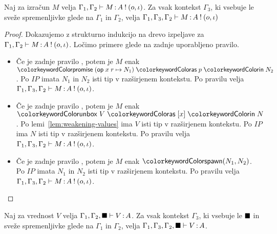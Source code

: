 \begin{lema}\label{lem:weakening-comp-2}
	Naj za izračun $M$ velja $\Gamma_1, \Gamma_2 \vdash M \mathinner{:} A \mathbin{!} (o, \iota)$. Za vsak kontekst $\Gamma_3$, ki vsebuje le sveže spremenljivke glede na $\Gamma_1$ in $\Gamma_2$, velja $\Gamma_1, \Gamma_3, \Gamma_2 \vdash M \mathinner{:} A \mathbin{!} (o, \iota)$
\end{lema}

\begin{proof}
	Dokazujemo z strukturno indukcijo na drevo izpeljave za $\Gamma_1, \Gamma_2 \vdash M \mathinner{:} A \mathbin{!} (o, \iota)$.
	Ločimo primere glede na zadnje uporabljeno pravilo.
	
	\begin{itemize}
		\item Če je zadnje pravilo , potem je $M$ enak $\tmwithrec{op}{x}{r}{N_1}{p}{N_2}$.
		Po $IP$ imata $N_1$ in $N_2$ isti tip v razširjenem kontekstu.
		Po pravilu  velja $\Gamma_1, \Gamma_3, \Gamma_2 \vdash M \mathinner{:} A \mathbin{!} (o, \iota)$.
		
		\item Če je zadnje pravilo , potem je $M$ enak $\tmunbox{V}{x}{N}$.
		Po lemi~\ref{lem:weakening-values} ima $V$ isti tip v razširjenem kontekstu.
		Po $IP$ ima $N$ isti tip v razširjenem kontekstu.
		Po pravilu  velja $\Gamma_1, \Gamma_3, \Gamma_2 \vdash M \mathinner{:} A \mathbin{!} (o, \iota)$.
		
		\item Če je zadnje pravilo , potem je $M$ enak $\tmspawn{N_1}{N_2}$.
		Po $IP$ imata $N_1$ in $N_2$ isti tip v razširjenem kontekstu.
		Po pravilu  velja $\Gamma_1, \Gamma_3, \Gamma_2 \vdash M \mathinner{:} A \mathbin{!} (o, \iota)$.
		
	\end{itemize}
\end{proof}


\begin{lema}\label{lem:weakening-values-bb}
	Naj za vrednost $V$ velja $\Gamma_1, \Gamma_2, \blacksquare \vdash V \mathinner{:} A$.
	Za vsak kontekst $\Gamma_3$, ki vsebuje le $\blacksquare$ in sveže spremenljivke glede na $\Gamma_1$ in $\Gamma_2$, velja $\Gamma_1, \Gamma_3, \Gamma_2, \blacksquare \vdash V \mathinner{:} A$.
\end{lema}

